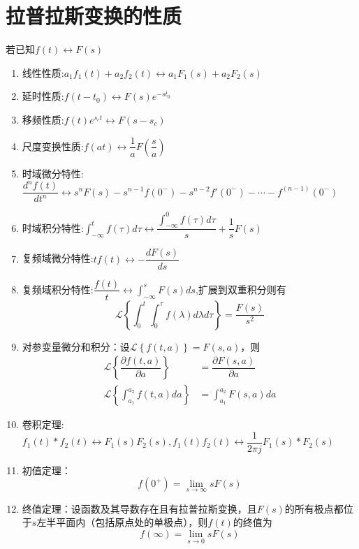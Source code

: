 \section{拉普拉斯变换的性质}
若已知$f(t)\leftrightarrow F(s)$
\begin{enumerate}
    \item 线性性质:$a_1 f_1(t)+a_2 f_2(t) \leftrightarrow a_1 F_1(s)+a_2 F_2(s)$
    \item 延时性质:$f(t-t_0)\leftrightarrow F(s)e^{-s t_0}$
    \item 移频性质:$f(t)e^{s_c t}\leftrightarrow F(s - s_c)$
    \item 尺度变换性质:$f(at)\leftrightarrow \dfrac{1}{a}F(\dfrac{s}{a})$
    \item 时域微分特性:$\dfrac{d^n f(t)}{dt^n}\leftrightarrow s^n F(s)-s^{n-1}f(0^-)-s^{n-2}f'(0^-)-\cdots -f^{(n-1)}(0^-)$
    \item 时域积分特性:$\int_{-\infty}^{t}f(\tau)d \tau \leftrightarrow \dfrac{\int_{-\infty}^0f(\tau)d\tau}{s}+\dfrac{1}{s}F(s)$
    \item 复频域微分特性:$tf(t)\leftrightarrow -\dfrac{d F(s)}{ds}$
    \item 复频域积分特性:$\dfrac{f(t)}{t}\leftrightarrow\int_{-\infty}^{s}F(s)d s$,扩展到双重积分则有
    \begin{equation}
        \mathcal{L}\left\{ \int_{0}^t \int_0^\tau f(\lambda)d\lambda d\tau \right\} = \dfrac{F(s)}{s^2}
    \end{equation}
    \item 对参变量微分和积分：设$\mathcal{L}\left\{f(t,a)\right\}=F(s,a)$，则
    \begin{align}
        \mathcal{L}\left\{\dfrac{\partial f(t,a)}{\partial a} \right\}&=\dfrac{\partial F(s,a)}{\partial a}\\
        \mathcal{L}\left\{\int_{a_1}^{a_2}f(t,a)da\right\}&=\int_{a_1}^{a_2}F(s,a)da
    \end{align}
    \item 卷积定理:$f_1(t) * f_2(t)\leftrightarrow F_1(s)F_2(s),f_1(t)f_2(t)\leftrightarrow \dfrac{1}{2\pi j}F_1(s)*F_2(s)$
    \item 初值定理：$$f(0^+)=\lim_{s\to \infty}sF(s)$$
    \item 终值定理：设函数及其导数存在且有拉普拉斯变换，且$F(s)$的所有极点都位于$s$左半平面内（包括原点处的单极点），则$f(t)$的终值为$$f(\infty)=\lim_{s\to 0}sF(s)$$
\end{enumerate}


